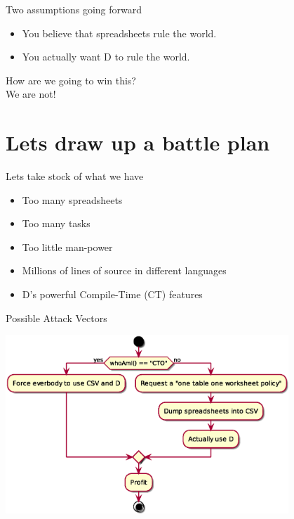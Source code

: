 \documentclass[aspectratio=169,notes]{beamer}
\begin{document}
	\begin{frame}{Two assumptions going forward}
		\begin{itemize}
			\item You believe that spreadsheets rule the world.
			\item You actually want D to rule the world.
		\end{itemize}
	\end{frame}

	\begin{frame}{\mbox{}}
		\begin{center}
			\huge
			How are we going to win this?\\[2cm]
			\pause
			We are not!
		\end{center}
	\end{frame}

	\section{Lets draw up a battle plan}

	\begin{frame}{Lets take stock of what we have}
		\begin{itemize}
			\item Too many spreadsheets \pause \CheckmarkBold
			\item Too many tasks \pause \CheckmarkBold
			\item Too little man-power \pause \CheckmarkBold
			\item Millions of lines of source in different languages \pause \CheckmarkBold
			\item D's powerful Compile-Time (CT) features \pause \CheckmarkBold
		\end{itemize}
	\end{frame}

	\begin{frame}{Possible Attack Vectors}
		\begin{center}
		\includegraphics[width=0.8\textwidth]{attackvectors.eps}
		\end{center}
	\end{frame}
\end{document}
